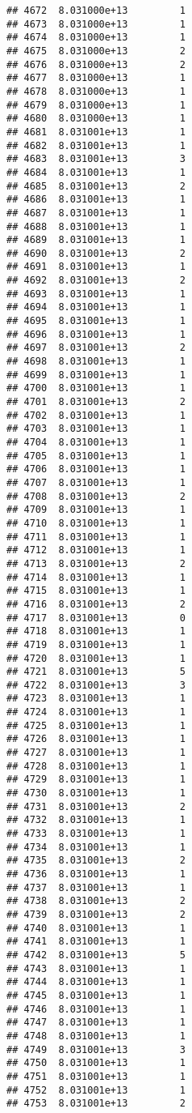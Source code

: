\documentclass[
]{article}
\begin{document}
\begin{verbatim}
## 4672  8.031000e+13         1
## 4673  8.031000e+13         1
## 4674  8.031000e+13         1
## 4675  8.031000e+13         2
## 4676  8.031000e+13         2
## 4677  8.031000e+13         1
## 4678  8.031000e+13         1
## 4679  8.031000e+13         1
## 4680  8.031000e+13         1
## 4681  8.031001e+13         1
## 4682  8.031001e+13         1
## 4683  8.031001e+13         3
## 4684  8.031001e+13         1
## 4685  8.031001e+13         2
## 4686  8.031001e+13         1
## 4687  8.031001e+13         1
## 4688  8.031001e+13         1
## 4689  8.031001e+13         1
## 4690  8.031001e+13         2
## 4691  8.031001e+13         1
## 4692  8.031001e+13         2
## 4693  8.031001e+13         1
## 4694  8.031001e+13         1
## 4695  8.031001e+13         1
## 4696  8.031001e+13         1
## 4697  8.031001e+13         2
## 4698  8.031001e+13         1
## 4699  8.031001e+13         1
## 4700  8.031001e+13         1
## 4701  8.031001e+13         2
## 4702  8.031001e+13         1
## 4703  8.031001e+13         1
## 4704  8.031001e+13         1
## 4705  8.031001e+13         1
## 4706  8.031001e+13         1
## 4707  8.031001e+13         1
## 4708  8.031001e+13         2
## 4709  8.031001e+13         1
## 4710  8.031001e+13         1
## 4711  8.031001e+13         1
## 4712  8.031001e+13         1
## 4713  8.031001e+13         2
## 4714  8.031001e+13         1
## 4715  8.031001e+13         1
## 4716  8.031001e+13         2
## 4717  8.031001e+13         0
## 4718  8.031001e+13         1
## 4719  8.031001e+13         1
## 4720  8.031001e+13         1
## 4721  8.031001e+13         5
## 4722  8.031001e+13         3
## 4723  8.031001e+13         1
## 4724  8.031001e+13         1
## 4725  8.031001e+13         1
## 4726  8.031001e+13         1
## 4727  8.031001e+13         1
## 4728  8.031001e+13         1
## 4729  8.031001e+13         1
## 4730  8.031001e+13         1
## 4731  8.031001e+13         2
## 4732  8.031001e+13         1
## 4733  8.031001e+13         1
## 4734  8.031001e+13         1
## 4735  8.031001e+13         2
## 4736  8.031001e+13         1
## 4737  8.031001e+13         1
## 4738  8.031001e+13         2
## 4739  8.031001e+13         2
## 4740  8.031001e+13         1
## 4741  8.031001e+13         1
## 4742  8.031001e+13         5
## 4743  8.031001e+13         1
## 4744  8.031001e+13         1
## 4745  8.031001e+13         1
## 4746  8.031001e+13         1
## 4747  8.031001e+13         1
## 4748  8.031001e+13         1
## 4749  8.031001e+13         3
## 4750  8.031001e+13         1
## 4751  8.031001e+13         1
## 4752  8.031001e+13         1
## 4753  8.031001e+13         2

\end{verbatim}
\end{document}
